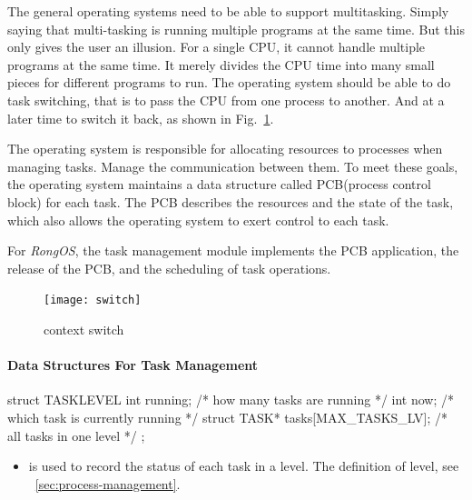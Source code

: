 \documentclass{swfcthesis}
\begin{document}
The general operating systems need to be able to support multitasking. Simply saying that
multi-tasking is running multiple programs at the same time. But this only gives the user
an illusion. For a single CPU, it cannot handle multiple programs at the same time. It
merely divides the CPU time into many small pieces for different programs to run. The
operating system should be able to do task switching, that is to pass the CPU from one
process to another. And at a later time to switch it back, as shown in
Fig.~\ref{fig:ctxt-switch}. 

The operating system is responsible for allocating resources to processes when managing
tasks. Manage the communication between them. To meet these goals, the operating system
maintains a data structure called PCB(process control block) for each task. The PCB
describes the resources and the state of the task, which also allows the operating system to
exert control to each task.

For \emph{RongOS}, the task management module implements the PCB application, the release
of the PCB, and the scheduling of task operations.


\begin{figure}
  \centering
  \begin{center}
    \texttt{[image: switch]}
  \end{center}
  \caption{context switch}
  \label{fig:ctxt-switch}
\end{figure}

\paragraph{Data Structures For Task Management}

\begin{codeblock}[1]
\begin{ccode}
struct TASKLEVEL
{ 
  int running; /* how many tasks are running */
  int now;     /* which task is currently running */
  struct TASK* tasks[MAX_TASKS_LV]; /* all tasks in one level */
};
\end{ccode}
\end{codeblock}
\begin{itemize}
\item is used to record the status of each task in a level. The definition of level, see
  ~\ref{sec:process-management}.
  
  
\end{itemize}
\end{document}
